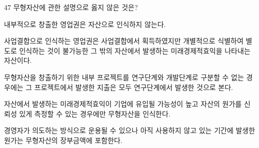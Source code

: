 \begin{question}{47}
무형자산에 관한 설명으로 옳지 않은 것은?
\begin{choices}
  \item 내부적으로 창출한 영업권은 자산으로 인식하지 않는다.
  \item 사업결합으로 인식하는 영업권은 사업결합에서 획득하였지만 개별적으로 식별하여 별도로 인식하는 것이 불가능한 그 밖의 자산에서 발생하는 미래경제적효익을 나타내는 자산이다.
  \item 무형자산을 창출하기 위한 내부 프로젝트를 연구단계와 개발단계로 구분할 수 없는 경우에는 그 프로젝트에서 발생한 지출은 모두 연구단계에서 발생한 것으로 본다.
  \item 자산에서 발생하는 미래경제적효익이 기업에 유입될 가능성이 높고 자산의 원가를 신뢰성 있게 측정할 수 있는 경우에만 무형자산을 인식한다.
  \item 경영자가 의도하는 방식으로 운용될 수 있으나 아직 사용하지 않고 있는 기간에 발생한 원가는 무형자산의 장부금액에 포함한다.
\end{choices}
\end{question}
